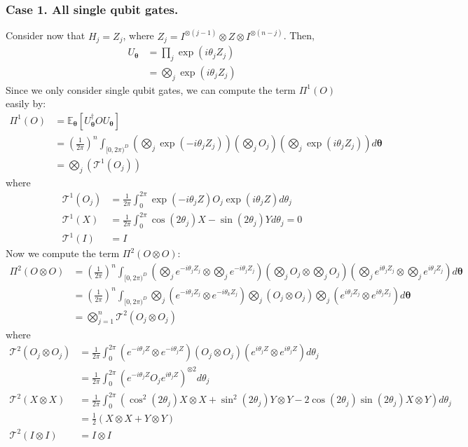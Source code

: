 \documentclass[a4paper,onecolumn,notitlepage,nofootinbib,longbibliography,superscriptaddress, floatfix, pra, aps, 10pt]{revtex4-2}
\newcommand{\vttheta}{{\bm{\theta}}}
\begin{document}
\subsubsection{Case 1. All single qubit gates.}
Consider now that $H_j = Z_j$, where $Z_j = I^{\otimes (j-1)} \otimes Z \otimes I^{\otimes (n-j)}$. Then, 
\begin{align}
    U_\vttheta & = \prod_{j}\exp(i\theta_j Z_j)  \\
    & = \bigotimes_j \exp(i\theta_j Z_j)
\end{align}
Since we only consider single qubit gates, we can compute the term $\Pi^1(O)$ easily by:
\begin{align}
    \Pi^1(O) & = \mathbb{E}_\vttheta \left[U_\vttheta^\dagger OU_\vttheta \right] \\
    &= \left(\frac{1}{2\pi}\right)^n\int_{[0,2\pi)^D}\left(\bigotimes_{j}\exp(-i\theta_j Z_j)\right) \left(\bigotimes_j O_j \right) \left(\bigotimes_{j}\exp(i\theta_j Z_j) \right) d\vttheta \\
    & = \bigotimes_j\left(\mathcal{T}^1(O_j) \right) \end{align}
where \begin{align}
\mathcal{T}^1(O_j) &= 
\frac{1}{2\pi}\int_{0}^{2\pi} \exp(-i\theta_j Z) O_j\exp(i\theta_j Z) d\theta_j\\
\mathcal{T}^1(X) & = 
\frac{1}{2\pi}\int_{0}^{2\pi} \cos{(2\theta_j)} X - \sin{(2\theta_j)}Y d\theta_j = 0\\
\mathcal{T}^1(I) &= I
\end{align}
Now we compute the term $\Pi^2(O\otimes O)$:
\begin{align}
    \Pi^2(O\otimes O) &= \left(\frac{1}{2\pi}\right)^n\int_{[0,2\pi)^D} \left(\bigotimes_{j}e^{-i\theta_j Z_j} \otimes \bigotimes_{j}e^{-i\theta_j Z_j} \right) \left(\bigotimes_j O_j \otimes \bigotimes_j O_j\right) \left(\bigotimes_{j}e^{i\theta_j Z_j} \otimes \bigotimes_{j}e^{i\theta_j Z_j}\right) d\vttheta \\
    &= \left(\frac{1}{2\pi}\right)^n\int_{[0,2\pi)^D} \bigotimes_{j} \left(e^{-i\theta_j Z_j} \otimes e^{-i\theta_k Z_j} \right)
    \bigotimes_j\left(O_j \otimes O_j\right) \bigotimes_j\left(e^{i\theta_j Z_j} \otimes e^{i\theta_j Z_j} \right)  d\vttheta \\
    &= \bigotimes_{j=1}^n\mathcal{T}^2(O_j \otimes O_j) 
    \end{align}
where \begin{align}
    \mathcal{T}^2(O_j \otimes O_j) &=  \frac{1}{2\pi} \int_0^{2\pi} \left(e^{-i\theta_j Z} \otimes e^{-i\theta_j Z} \right)\left(O_j \otimes O_j \right) \left(e^{i\theta_j Z} \otimes e^{i\theta_j Z}\right) d\theta_j  \\
    &= \frac{1}{2\pi} \int_0^{2\pi} \left(e^{-i\theta_j Z} O_j e^{i\theta_j Z} \right)^{\otimes 2} d\theta_j  \\
    \mathcal{T}^2(X \otimes X) 
    &= \frac{1}{2\pi} \int_0^{2\pi}\left( \cos^2(2\theta_j)X\otimes X + \sin^2(2\theta_j)Y\otimes Y - 2 \cos(2\theta_j) \sin(2\theta_j)X\otimes Y \right)d\theta_j  \\
    & = \frac{1}{2} (X \otimes X + Y \otimes Y) \\
    \mathcal{T}^2(I \otimes I) & = I \otimes I
\end{align}
\end{document}
